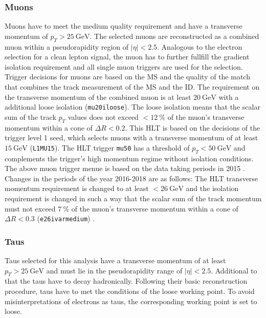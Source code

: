 \subsubsection*{Muons}
Muons have to meet the medium quality requirement and have a transverse momentum of $p_T>\SI{25}{\giga\electronvolt}$. The selected muons are reconstructed as a combined muon within a pseudorapidity region of $|\eta|<2.5$. Analogous to the electron selection for a clean lepton signal, the muon has to further fullfill the gradient isolation requirement and all single muon triggers are used for the selection.\newline
Trigger decisions for muons are based on the MS and the quality of the match that combines the track measurement of the MS and the ID. The requirement on the transverse momentum of the combined muon is at least $\SI{20}{\giga\electronvolt}$ with a additional loose isolation (\texttt{mu20\textunderscore iloose}). The loose isolation means that the scalar sum of the track $p_T$ values does not exceed $<\SI{12}{\percent}$ of the muon's transverse momentum within a cone of $\Delta R<0.2$. This HLT is based on the decisions of the trigger level 1 seed, which selects muons with a transverse momentum of at least $\SI{15}{\giga\electronvolt}$ (\texttt{L1MU15}). The HLT trigger \texttt{mu50} has a threshold of $p_T<\SI{50}{\giga\electronvolt}$ and complements the trigger's high momentum regime without isolation conditions. The above muon trigger menue is based on the data taking periods in 2015 \cite{trigger:e:mu}. Changes in the periods of the year 2016-2018 are as follows: \newline
The HLT transverse momentum requirement is changed to at least $<\SI{26}{\giga\electronvolt}$ and the isolation requirement is changed in such a way that the scalar sum of the track momentum must not exceed $\SI{7}{\percent}$ of the muon's transverse momentum within a cone of $\Delta R<0.3$ (\texttt{e26\textunderscore ivarmedium}) \cite{trigger:mu}.            
%
%
\subsubsection*{Taus}
Taus selected for this analysis have a transverse momentum of at least $p_T>\SI{25}{\giga\electronvolt}$ and must lie in the pseudorapidity range of $|\eta|<2.5$. Additional to that the taus have to decay hadronically. Following their basic reconstruction procedure, taus have to met the conditions of the loose working point. To avoid misinterpretations of electrons as taus, the corresponding working point is set to loose.

